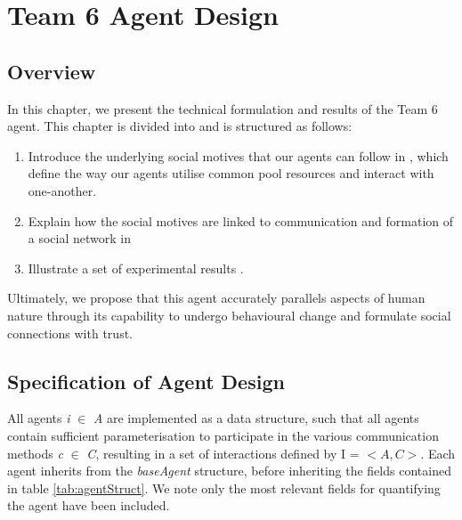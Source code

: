 \chapter{Team 6 Agent Design}\label{team_6_agent_design}

\section{Overview}

In this chapter, we present the technical formulation and results of the Team 6 agent. This chapter is divided into  and is structured as follows: 
\begin{enumerate}
    \item Introduce the underlying social motives that our agents can follow in , which define the way our agents utilise common pool resources  and interact with one-another. 
    \item Explain how the social motives are linked to communication and formation of a social network in 
    
    \item Illustrate a set of experimental results . 
\end{enumerate}

Ultimately, we propose that this agent accurately parallels aspects of human nature through its capability to undergo behavioural change and formulate social connections with trust.


\section{Specification of Agent Design}

All agents \textit{i} $\in$ \textit{A} are implemented as a data structure, such that all agents contain sufficient parameterisation to participate in the various communication methods \textit{c} $\in$ \textit{C}, resulting in a set of interactions defined by I = $< \mathit{A, C} >$. Each agent inherits from the \textit{baseAgent} structure, before inheriting the fields contained in table \ref{tab:agentStruct}. We note only the most relevant fields for quantifying the agent have been included.

